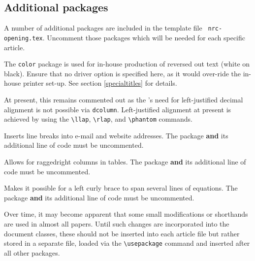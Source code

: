 \subsection{Additional packages}

A number of additional packages are included in the template file {\tt
nrc-opening.tex}. Uncomment those packages which will be needed for
each specific article. 


\begin{description} \itemsep=0pt
   \item [{\tt \blash usepackage\char`\{color\char`\}}]

         The \verb|color| package is used for in-house production of
         reversed out text (white on black). Ensure that no driver
         option is specified here, as it would over-ride the in-house
         printer set-up. See section \ref{specialtitles} for details.

   \item [{\tt \blash usepackage\char`\{dcolumn\char`\}}]

         At present, this remains commented out as the \NRC's need for
         left-justified decimal alignment is not possible via
         \texttt{dcolumn}. Left-justified alignment at present is
         achieved by using the \verb|\llap|, \verb|\rlap|, and
         \verb|\phantom| commands.

   \item [{\tt \blash usepackage\char`\{url\char`\}}]

         Inserts line breaks into e-mail and website addresses. The
         package \textbf{and} its additional line of code must be
         uncommented.

   \item [{\tt \blash usepackage\char`\{array\char`\}}]

         Allows for raggedright columns in tables. The package
         \textbf{and} its additional line of code must be uncommented.

   \item [{\tt \blash usepackage\char`\{cases\char`\}}]

         Makes it possible for a left curly brace to span several
         lines of equations. The package \textbf{and} its additional
         line of code must be uncommented.

   \item [personal macros] 

         Over time, it may become apparent that some small
         modifications or shorthands are used in almost all
         papers. Until such changes are incorporated into the document
         classes, these should not be inserted into each article file
         but rather stored in a separate file, loaded via the
         \verb|\usepackage| command and inserted after all other
         packages.
\end{description}

